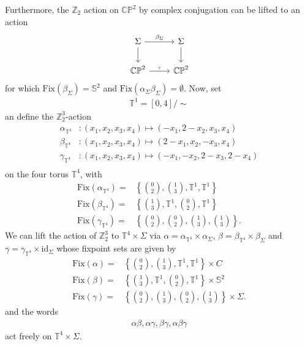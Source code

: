 \documentclass[psamsfonts]{amsart}
\theoremstyle{plain}
\theoremstyle{definition}{
\newtheorem{defi}{Definition}[section]
\newtheorem{ass}{Assumption}
\newtheorem*{nota}{Notation}}
\theoremstyle{remark}{
\newtheorem{rem}{Remark}
\newtheorem{ex}{Example}}
\theoremstyle{plain}{
\newtheorem{thm}{Theorem}[section]
\newtheorem{lem}{Lemma}[section]
\newtheorem{cor}{Corollary}[section]
\newtheorem{prop}{Proposition}[section]
\newtheorem{con}{Conjecture}[section]}
\newcommand{\m}[1]{{\mathrm{#1}}}
\begin{document}
\begin{ex}
Furthermore, the $\mathbb{Z}_2$ action on $\mathbb{CP}^2$ by complex conjugation can be lifted to an action 
\begin{equation*}
    \begin{tikzcd}
            \Sigma\arrow[r,"\beta_{\Sigma}"]\arrow[d]&\Sigma\arrow[d]\\
            \mathbb{CP}^2\arrow[r,"\overline{.}"]&\mathbb{CP}^2
    \end{tikzcd}
\end{equation*}
for which $\m{Fix}(\beta_{\Sigma})=\mathbb{S}^2$ and $\m{Fix}(\alpha_{\Sigma}\beta_{\Sigma})=\emptyset$. Now, set 
\begin{align*}
    \mathbb{T}^1=[0,4]/\sim
\end{align*}
an define the $\mathbb{Z}^3_2$-action
\begin{align*}
    \alpha_{\mathbb{T}^4}&\colon (x_1,x_2,x_3,x_4)\mapsto(-x_1,2-x_2,x_3,x_4)\\
    \beta_{\mathbb{T}^4}&\colon (x_1,x_2,x_3,x_4)\mapsto(2-x_1,x_2,-x_3,x_4)\\
    \gamma_{\mathbb{T}^4}&\colon (x_1,x_2,x_3,x_4)\mapsto(-x_1,-x_2,2-x_3,2-x_4)\\
\end{align*}
on the four torus $\mathbb{T}^4$, with 
\begin{align*}
    \m{Fix}(\alpha_{\mathbb{T}^4})=&\left\{{0\choose 2},{1\choose 3},\mathbb{T}^1,\mathbb{T}^1\right\}\\
    \m{Fix}(\beta_{\mathbb{T}^4})=&\left\{{1\choose 3},\mathbb{T}^1,{0\choose 2},\mathbb{T}^1\right\}\\
    \m{Fix}(\gamma_{\mathbb{T}^4})=&\left\{{0\choose 2},{0\choose 2},{1\choose 3},{1\choose 3}\right\}.
\end{align*}
We can lift the action of $\mathbb{Z}_2^3$ to $\mathbb{T}^4\times \Sigma$ via $\alpha= \alpha_{\mathbb{T}^4}\times \alpha_{\Sigma}$, $\beta=\beta_{\mathbb{T}^4}\times \beta_{\Sigma}$ and $\gamma=\gamma_{\mathbb{T}^4}\times \m{id}_{\Sigma}$ whose fixpoint sets are given by 
\begin{align*}
    \m{Fix}(\alpha)=&\left\{{0\choose 2},{1\choose 3},\mathbb{T}^1,\mathbb{T}^1\right\}\times C\\
    \m{Fix}(\beta)=&\left\{{1\choose 3},\mathbb{T}^1,{0\choose 2},\mathbb{T}^1\right\}\times \mathbb{S}^2\\
    \m{Fix}(\gamma)=&\left\{{0\choose 2},{1\choose 3},{0\choose 2},{1\choose 3}\right\}\times \Sigma.
\end{align*}
and the words 
\begin{align*}
    \alpha\beta,\alpha\gamma,\beta\gamma,\alpha\beta\gamma
\end{align*}
act freely on  $\mathbb{T}^4\times \Sigma$.\\


\end{ex}
\end{document}
